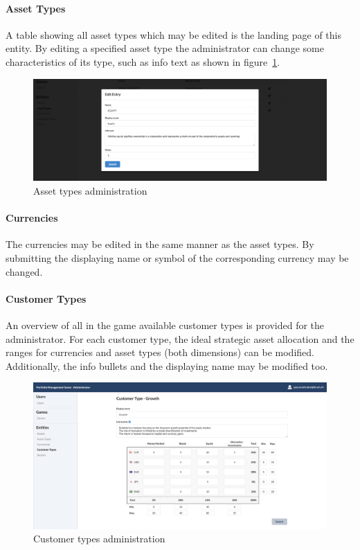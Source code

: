 \paragraph{Asset Types}
A table showing all asset types which may be edited is the landing page of this entity. By editing a specified asset type the administrator can change some characteristics of its type, such as info text as shown in figure~\ref{fig:asset_types}.
\begin{figure}[h!]
  \centering
  \includegraphics[scale=0.2]{img/application-overview/administrator/entities_asset_types.png}
  \caption{Asset types administration}
  \label{fig:asset_types}
\end{figure}

\paragraph{Currencies}
The currencies may be edited in the same manner as the asset types. By submitting the displaying name or symbol of the corresponding currency may be changed.

\paragraph{Customer Types}
An overview of all in the game available customer types is provided for the administrator. For each customer type, the ideal strategic asset allocation and the ranges for currencies and asset types (both dimensions) can be modified. Additionally, the info bullets and the displaying name may be modified too.
\begin{figure}[h!]
  \centering
  \includegraphics[scale=0.2]{img/application-overview/administrator/entities_customer_types.png}
  \caption{Customer types administration}
\end{figure}


